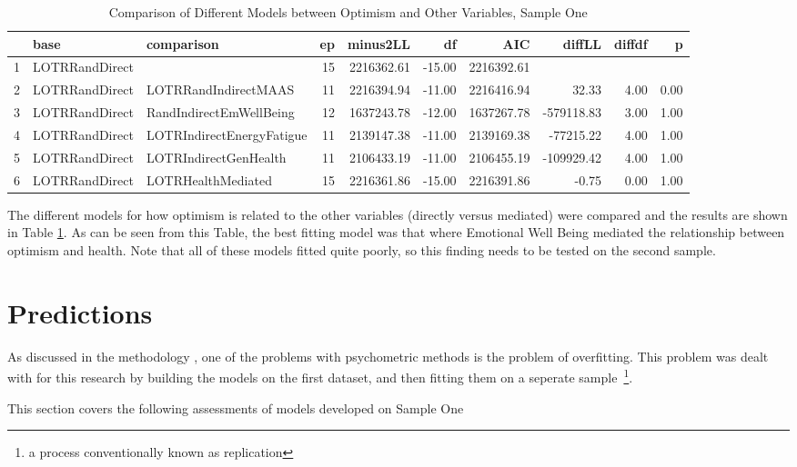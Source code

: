 \documentclass{article}
\begin{document}
\begin{table}[ht]
\centering
\begin{tabular}{rllrrrrrrr}
  \hline
 & base & comparison & ep & minus2LL & df & AIC & diffLL & diffdf & p \\ 
  \hline
1 & LOTRRandDirect &  &  15 & 2216362.61 & -15.00 & 2216392.61 &  &  &  \\ 
  2 & LOTRRandDirect & LOTRRandIndirectMAAS &  11 & 2216394.94 & -11.00 & 2216416.94 & 32.33 & 4.00 & 0.00 \\ 
  3 & LOTRRandDirect & RandIndirectEmWellBeing &  12 & 1637243.78 & -12.00 & 1637267.78 & -579118.83 & 3.00 & 1.00 \\ 
  4 & LOTRRandDirect & LOTRIndirectEnergyFatigue &  11 & 2139147.38 & -11.00 & 2139169.38 & -77215.22 & 4.00 & 1.00 \\ 
  5 & LOTRRandDirect & LOTRIndirectGenHealth &  11 & 2106433.19 & -11.00 & 2106455.19 & -109929.42 & 4.00 & 1.00 \\ 
  6 & LOTRRandDirect & LOTRHealthMediated &  15 & 2216361.86 & -15.00 & 2216391.86 & -0.75 & 0.00 & 1.00 \\ 
   \hline
\end{tabular}
\caption{Comparison of Different Models between Optimism and Other Variables, Sample One} 
\label{tab:lotrmodcomp1}
\end{table}
The different models for how optimism is related to the other variables (directly versus mediated) were compared and the results are shown in Table \ref{tab:lotrmodcomp1}. As can be seen from this Table, the best fitting model was that where Emotional Well Being mediated the relationship between optimism and health. Note that all of these models fitted quite poorly, so this finding needs to be tested on the second sample. 

\section{Predictions}
\label{sec:predictions}

As discussed in the methodology , one of the problems with psychometric methods is the problem of overfitting. This problem was dealt with for this research by building the models on the first dataset, and then fitting them on a seperate sample~\footnote{a process conventionally known as replication}. 

This section covers the following assessments of models developed on Sample One
\end{document}
